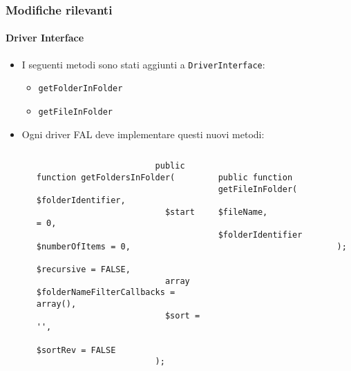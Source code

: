 \begin{frame}[fragile]
	\frametitle{Modifiche rilevanti}
	\framesubtitle{Driver Interface}

	\lstset{basicstyle=\tiny\ttfamily}

	\begin{itemize}

		\item I seguenti metodi sono stati aggiunti a \texttt{DriverInterface}:

			\begin{itemize}
				\item \texttt{getFolderInFolder}
				\item \texttt{getFileInFolder}
			\end{itemize}

		\item Ogni driver FAL deve implementare questi nuovi metodi:

			\begin{columns}[T]
				\begin{column}{.07\textwidth}
                \end{column}
				\begin{column}{.465\textwidth}

					\begin{lstlisting}
						public function getFoldersInFolder(
						  $folderIdentifier,
						  $start = 0,
						  $numberOfItems = 0,
						  $recursive = FALSE,
						  array $folderNameFilterCallbacks = array(),
						  $sort = '',
						  $sortRev = FALSE
						);
					\end{lstlisting}

                \end{column}
				\begin{column}{.465\textwidth}

					\begin{lstlisting}
						public function getFileInFolder(
						  $fileName,
						  $folderIdentifier
						);
					\end{lstlisting}

				\end{column}
			\end{columns}

	\end{itemize}

	\breakingchange

\end{frame}


